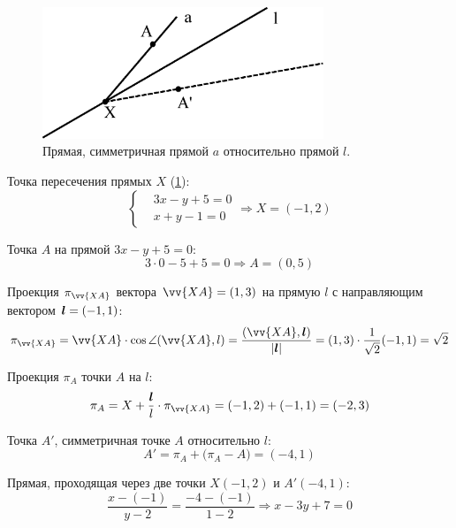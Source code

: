 \documentclass[a4paper,12pt]{article}
\begin{document}
  \begin{solution}
    \begin{figure}[h]
      \centering
      
      \includegraphics[width=0.75\textwidth]{symmetrice}
      
      \caption{Прямая, симметричная прямой $a$ относительно прямой $l$.}
      \label{fig:symmetrice}
    \end{figure}

    Точка пересечения прямых $X$ (\ref{fig:symmetrice}):
    \[
      \left\{\begin{aligned}
        &3x - y + 5 = 0\\
        &x + y - 1 = 0
      \end{aligned}\right.
      \Rightarrow X = (-1, 2)
    \]

    Точка $A$ на прямой $3x - y + 5 = 0$:
    \[
      3 \cdot 0 - 5 + 5 = 0
      \Rightarrow A = (0, 5)
    \]
    
    Проекция $\pi_{\vv{XA}}$ вектора $\vv{XA} \hm= (1, 3)$ на прямую $l$ с направляющим вектором $\boldsymbol l = (-1, 1)$:
    \[
      \pi_{\vv{XA}} = \vv{XA} \cdot \cos \angle(\vv{XA}, l)
      = \frac{(\vv{XA}, \bds l)}{|\bds l|}
      = (1, 3) \cdot \frac{1}{\sqrt 2} (-1, 1)
      = \sqrt 2
    \]

    Проекция $\pi_A$ точки $A$ на $l$:
    \[
      \pi_A = X + \frac{\bds l}{l} \cdot \pi_{\vv{XA}}
      = (-1, 2) + (-1, 1) = (-2, 3)
    \]

    Точка $A'$, симметричная точке $A$ относительно $l$:
    \[
      A' = \pi_A + \bigl(\pi_A - A\bigr) = (-4, 1)
    \]

    Прямая, проходящая через две точки $X(-1, 2)$ и $A'(-4, 1)$:
    \[
      \frac{x - (-1)}{y - 2} = \frac{-4 - (-1)}{1 - 2}
      \Rightarrow
      \boxed{x - 3y + 7 = 0}
    \]
  \end{solution}
  
  
\end{document}
